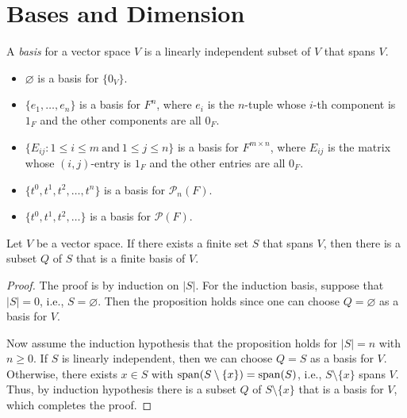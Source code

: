 \section{Bases and Dimension}
\begin{definition}\label{def:basis}
  A \emph{basis} for a vector space $V$ is a linearly independent subset of $V$
  that spans $V$.
\end{definition}

\begin{examples}
  \leavevmode
  \begin{itemize}
    \item $\varnothing$ is a basis for $\{0_V\}$.
    \item $\{e_1, \dots, e_n\}$ is a basis for $F^n$, where $e_i$ is the
      $n$-tuple whose $i$-th component is $1_F$ and the other components are
      all $0_F$.
    \item $\{E_{ij} : 1 \leq i \leq m\ \text{and}\ 1 \leq j \leq n\}$ is a
      basis for $F^{m \times n}$, where $E_{ij}$ is the matrix whose
      $(i, j)$-entry is $1_F$ and the other entries are all $0_F$.
    \item $\{t^0, t^1, t^2, \dots, t^n\}$ is a basis for $\mathcal{P}_n(F)$.
    \item $\{t^0, t^1, t^2, \dots\}$ is a basis for $\mathcal{P}(F)$.
  \end{itemize}
\end{examples}

\begin{proposition}\label{prop:finite-basis-existence}
  Let $V$ be a vector space.
  If there exists a finite set $S$ that spans $V$, then there is a subset
  $Q$ of $S$ that is a finite basis of $V$.
\end{proposition}
\begin{proof}
  The proof is by induction on $|S|$.
  For the induction basis, suppose that $|S| = 0$, i.e., $S = \varnothing$.
  Then the proposition holds since one can choose $Q = \varnothing$ as a basis
  for $V$.

  Now assume the induction hypothesis that the proposition holds for $|S| = n$
  with $n \geq 0$.
  If $S$ is linearly independent, then we can choose $Q = S$ as a basis for
  $V$.
  Otherwise, there exists $x \in S$ with $\operatorname{span}(S \setminus \{x\}) = \operatorname{span}(S)$,
  i.e., $S \setminus \{x\}$ spans $V$.
  Thus, by induction hypothesis there is a subset $Q$ of $S \setminus \{x\}$
  that is a basis for $V$, which completes the proof.
\end{proof}

